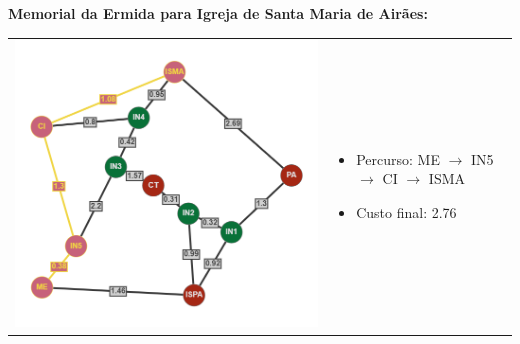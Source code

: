 \documentclass[12pt]{article}
\begin{document}
    \noindent\textbf{ Memorial da Ermida para Igreja de Santa Maria de Airães:}\\
    \begin{tabular}{@{}m{}m{}@{}}
      \centering\includegraphics[scale=0.4]{anexos/ME-ISMA.png} &
      \begin{itemize}
        \item Percurso: ME $\rightarrow$ IN5 $\rightarrow$ CI $\rightarrow$ ISMA
        \item Custo final: 2.76
      \end{itemize}
    \end{tabular} 
    
\end{document}
